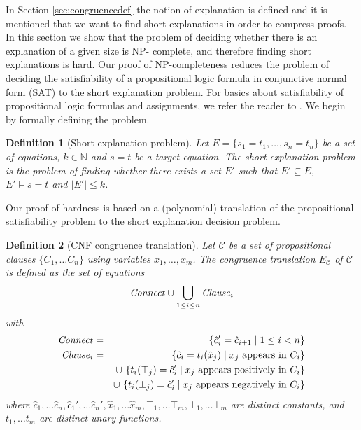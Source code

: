 \documentclass{easychair}
\newtheorem{definition}{Definition}
\begin{document}
In Section \ref{sec:congruencedef} the notion of explanation is
defined and it is mentioned that we want to find short explanations
in order to compress proofs. In this section we show that the problem
of deciding whether there is an explanation of a given size is NP-
complete, and therefore finding short explanations is hard. Our proof
of NP-completeness reduces the problem of deciding the satisfiability
of a propositional logic formula in conjunctive normal form (SAT) to
the short explanation problem. For basics about satisfiability of
propositional logic formulas and assignments, we refer the reader to
\cite{Biere3}. We begin by formally defining the problem.


\begin{definition}[Short explanation problem]
Let $E = \{ s_1 = t_1,\ldots, s_n = t_n\}$ be a set of equations, 
$k \in \mathbb{N}$ and $s = t$ be a target equation.  
The \emph{short explanation problem} is the problem of finding 
whether there exists a set $E'$ such that $E' \subseteq E$, 
$E' \models s = t$ and $|E'| \leq k$.
\end{definition}

\noindent Our proof of hardness is based on a (polynomial) 
translation of the propositional satisfiability problem to 
the short explanation decision problem.

\newcommand{\Assignment}{{\it Assignment}}
\newcommand{\Clause}{{\it Clause}}
\newcommand{\Connect}{{\it Connect}}

\begin{definition}[CNF congruence translation]

Let $\mathcal{C}$ be a set of propositional clauses $\{C_1,\ldots C_n\}$ using variables $x_1,\ldots,x_m$.
The congruence translation $E_{\mathcal{C}}$ of $\mathcal{C}$ is defined as the set of equations
\begin{equation*}
\Connect \cup \bigcup_{1 \leq i \leq n}\Clause_i 
\end{equation*}
with
\begin{eqnarray*}
	\Connect &=& \{ \hat{c}_{i}' = \hat{c}_{i+1} \mid 1 \leq i < n\}\\
        \Clause_i &=& \{ \hat{c}_i = t_i(\hat{x}_j) \mid x_j \text{ appears in } C_i \}\\
           & & \cup\ \{ t_i(\top_j) = \hat{c}_i' \mid x_j \text{ appears positively in } C_i \}\\
           & & \cup\ \{ t_i(\bot_j) = \hat{c}_i' \mid x_j \text{ appears negatively in } C_i \}
\end{eqnarray*}
where $\hat{c}_{1},\dots \hat{c}_{n},\hat{c}_{1}', \dots \hat{c}_{n}',
\hat{x}_1, \dots \hat{x}_m, \top_1, \dots \top_m, \bot_1, \dots \bot_m$ are distinct constants, and $t_1, \dots t_m$ are
distinct unary functions.

\end{definition}
\end{document}
